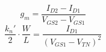 %
\begin{equation}
  \label{eq:transconduct}
  g_m = \frac{I_{D2}-I_{D1}}{V_{GS2}-V_{GS1}}
\end{equation}
%
\begin{equation}
  \label{eq:phys}
  \frac{k_n'}{2} \cdot \frac{W}{L} = \frac{I_{D1}}{(V_{GS1} - V_{TN})^2}
\end{equation}


